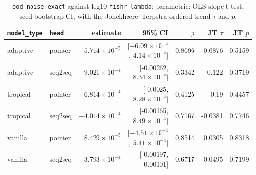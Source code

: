 \documentclass[10pt]{article}
\begin{document}
{\small
\begin{longtable}{llrrrrr}
\caption{\texttt{ood\_noise\_exact} against log10 \texttt{fishr\_lambda}: parametric: OLS slope t-test, seed-bootstrap CI, with the Jonckheere--Terpstra ordered-trend $\tau$ and $p$.}\label{tab:trend-ood_noise_exact}\\
\toprule
\texttt{model\_type} & \texttt{head} & estimate & 95\% CI & $p$ & JT $\tau$ & JT $p$\\
\midrule
\endhead
adaptive & pointer & $-5.714\times10^{-5}$ & [$-6.09\times10^{-4}$, $4.14\times10^{-4}$] & 0.8696 & 0.0876 & 0.5159\\
adaptive & seq2seq & $-9.021\times10^{-4}$ & [-0.00262, $8.34\times10^{-4}$] & 0.3342 & -0.122 & 0.3719\\
tropical & pointer & $-6.814\times10^{-4}$ & [-0.0025, $8.28\times10^{-4}$] & 0.4125 & -0.19 & 0.4457\\
tropical & seq2seq & $-4.014\times10^{-4}$ & [-0.00165, $8.49\times10^{-4}$] & 0.7167 & -0.0381 & 0.7746\\
vanilla & pointer & $8.429\times10^{-5}$ & [$-4.51\times10^{-4}$, $5.41\times10^{-4}$] & 0.8514 & 0.0305 & 0.8318\\
vanilla & seq2seq & $-3.793\times10^{-4}$ & [-0.00197, 0.00101] & 0.6717 & 0.0495 & 0.7199\\
\bottomrule
\end{longtable}
}
\end{document}
